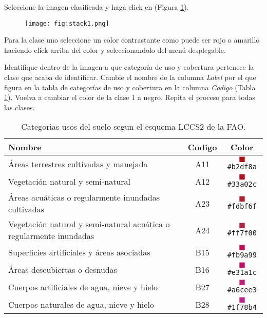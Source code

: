 Seleccione la imagen clasificada y haga click en  (Figura \ref{fig:colman}).

\begin{figure}[h!]
    \centering
    \texttt{[image: fig:stack1.png]}
    \caption{}
    \label{fig:colman}
\end{figure}

Para la clase uno seleccione un color contrastante como puede ser rojo o amarillo haciendo click arriba del color y seleccionandolo del menú desplegable.

Identifique dentro de la imagen a que categoría de uso y cobertura pertenece la clase que acaba de identificar.  Cambie el nombre de la columna \emph{Label} por el que figura en la tabla de categorías de uso y cobertura en la columna \emph{Codigo} (Tabla \ref{tab:usos}). Vuelva a cambiar el color de la clase 1 a negro. Repita el proceso para todas las clases.

\begin{table}[hbt]
    \centering
    \begin{tabular}{p{11cm}cc}
        \toprule
        Nombre & Codigo & Color \\
        \midrule
        Áreas terrestres cultivadas y manejada & A11 & \textcolor{A11}{$\blacksquare$}\texttt{\#b2df8a}
        \\
        Vegetación natural y semi-natural & A12 & \textcolor{A12}{$\blacksquare$}\texttt{\#33a02c}\\
        Áreas acuáticas o regularmente inundadas cultivadas & A23  &
        \textcolor{A23}{$\blacksquare$}\texttt{\#fdbf6f}\\
        Vegetación natural y semi-natural acuática o
	regularmente inundadas & A24 & \textcolor{A24}{$\blacksquare$}\texttt{\#ff7f00}\\
        Superficies artificiales y áreas asociadas & B15  &
        \textcolor{B15}{$\blacksquare$}\texttt{\#fb9a99}\\
        Áreas descubiertas o desnudas & B16 & \textcolor{B16}{$\blacksquare$}\texttt{\#e31a1c}\\
        Cuerpos artificiales de agua, nieve y hielo & B27 &
        \textcolor{B27}{$\blacksquare$}\texttt{\#a6cee3}\\
        Cuerpos naturales de agua, nieve y hielo & B28&
        \textcolor{B28}{$\blacksquare$}\texttt{\#1f78b4}\\
        \bottomrule
    \end{tabular}
\caption{\label{tab:usos}Categorias usos del suelo segun el esquema LCCS2 de la FAO.}
\end{table}

